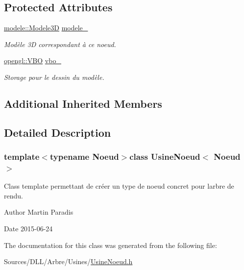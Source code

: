 \subsection*{Protected Attributes}
\begin{DoxyCompactItemize}
\item 
\hypertarget{class_usine_noeud_a41150bf720451994fc944328e5966de7}{}\hyperlink{classmodele_1_1_modele3_d}{modele\+::\+Modele3\+D} \hyperlink{class_usine_noeud_a41150bf720451994fc944328e5966de7}{modele\+\_\+}\label{class_usine_noeud_a41150bf720451994fc944328e5966de7}

\begin{DoxyCompactList}\small\item\em Modèle 3\+D correspondant à ce noeud. \end{DoxyCompactList}\item 
\hypertarget{class_usine_noeud_a255ba23be7c197be82afdd3e7de6a651}{}\hyperlink{classopengl_1_1_v_b_o}{opengl\+::\+V\+B\+O} \hyperlink{class_usine_noeud_a255ba23be7c197be82afdd3e7de6a651}{vbo\+\_\+}\label{class_usine_noeud_a255ba23be7c197be82afdd3e7de6a651}

\begin{DoxyCompactList}\small\item\em Storage pour le dessin du modèle. \end{DoxyCompactList}\end{DoxyCompactItemize}
\subsection*{Additional Inherited Members}


\subsection{Detailed Description}
\subsubsection*{template$<$typename Noeud$>$class Usine\+Noeud$<$ Noeud $>$}

Class template permettant de créer un type de noeud concret pour l\textquotesingle{}arbre de rendu. 

\begin{DoxyAuthor}{Author}
Martin Paradis 
\end{DoxyAuthor}
\begin{DoxyDate}{Date}
2015-\/06-\/24 
\end{DoxyDate}


The documentation for this class was generated from the following file\+:\begin{DoxyCompactItemize}
\item 
Sources/\+D\+L\+L/\+Arbre/\+Usines/\hyperlink{_usine_noeud_8h}{Usine\+Noeud.\+h}\end{DoxyCompactItemize}
